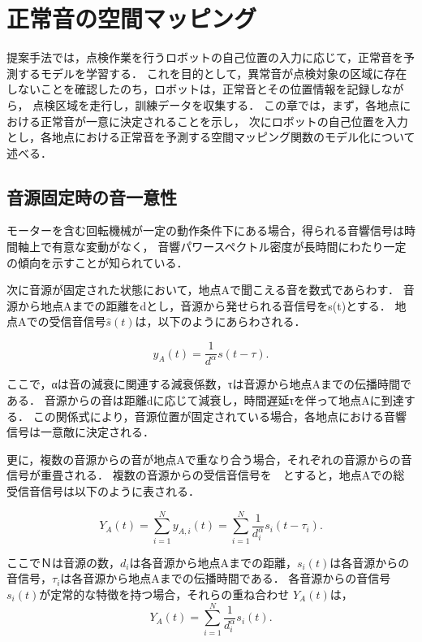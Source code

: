 \documentclass[../main]{subfiles}
\begin{document}
\section{正常音の空間マッピング}
\label{sec:pmethod_mapping}

提案手法では，点検作業を行うロボットの自己位置の入力に応じて，正常音を予測するモデルを学習する．
これを目的として，異常音が点検対象の区域に存在しないことを確認したのち，ロボットは，正常音とその位置情報を記録しながら，
点検区域を走行し，訓練データを収集する．
この章では，まず，各地点における正常音が一意に決定されることを示し，
次にロボットの自己位置を入力とし，各地点における正常音を予測する空間マッピング関数のモデル化について述べる．
\subsection{音源固定時の音一意性}

モーターを含む回転機械が一定の動作条件下にある場合，得られる音響信号は時間軸上で有意な変動がなく，
音響パワースペクトル密度が長時間にわたり一定の傾向を示すことが知られている\cite{beranek1992noise}．

次に音源が固定された状態において，地点Aで聞こえる音を数式であらわす．
音源から地点Aまでの距離をdとし，音源から発せられる音信号をs(t)とする．
地点Aでの受信音信号\(\hat{s}(t)\)は，以下のようにあらわされる．

\begin{equation} y_A(t) = \frac{1}{d^\alpha} s(t - \tau). \end{equation}

ここで，αは音の減衰に関連する減衰係数，τは音源から地点Aまでの伝播時間である．
音源からの音は距離dに応じて減衰し，時間遅延τを伴って地点Aに到達する．
この関係式により，音源位置が固定されている場合，各地点における音響信号は一意敵に決定される．

更に，複数の音源からの音が地点Aで重なり合う場合，それぞれの音源からの音信号が重畳される．
複数の音源からの受信音信号を　とすると，地点Aでの総受信音信号は以下のように表される．

\begin{equation} Y_A(t) = \sum_{i=1}^{N} y_{A,i}(t) = \sum_{i=1}^{N} \frac{1}{d_i^\alpha} s_i(t - \tau_i). \end{equation}

ここでＮは音源の数，\(d_i\)は各音源から地点Aまでの距離，\(s_i(t)\)は各音源からの音信号，\(\tau_i\)は各音源から地点Aまでの伝播時間である．
各音源からの音信号　\(s_i(t)\)が定常的な特徴を持つ場合，それらの重ね合わせ
\(Y_A(t)\)は，
\begin{equation} Y_A(t) = \sum_{i=1}^{N} \frac{1}{d_i^\alpha} s_i(t). \end{equation}
\end{document}
